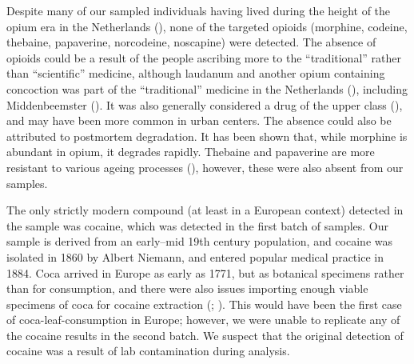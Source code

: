 \documentclass[
  11pt,
  leqno]{scrartcl}
\begin{document}
Despite many of our sampled individuals having lived during the height
of the opium era in the Netherlands
(), none of the
targeted opioids (morphine, codeine, thebaine, papaverine, norcodeine,
noscapine) were detected. The absence of opioids could be a result of
the people ascribing more to the ``traditional'' rather than
``scientific'' medicine, although laudanum and another opium containing
concoction was part of the ``traditional'' medicine in the Netherlands
(), including Middenbeemster (). It was also generally considered a drug of the upper class
(), and may have
been more common in urban centers. The absence could also be attributed
to postmortem degradation. It has been shown that, while morphine is
abundant in opium, it degrades rapidly. Thebaine and papaverine are more
resistant to various ageing processes
(),
however, these were also absent from our samples.

The only strictly modern compound (at least in a European context)
detected in the sample was cocaine, which was detected in the first
batch of samples. Our sample is derived from an early--mid 19th century
population, and cocaine was isolated in 1860 by Albert Niemann, and
entered popular medical practice in 1884. Coca arrived in Europe as
early as 1771, but as botanical specimens rather than for consumption,
and there were also issues importing enough viable specimens of coca for
cocaine extraction (; ).
This would have been the first case of coca-leaf-consumption in Europe;
however, we were unable to replicate any of the cocaine results in the
second batch. We suspect that the original detection of cocaine was a
result of lab contamination during analysis.
\end{document}

